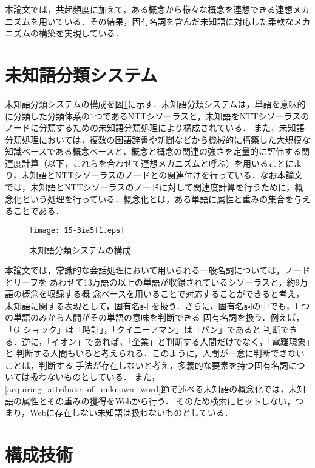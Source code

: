 \documentclass[japanese]{jnlp_1.4}
\begin{document}
本論文では，共起頻度に加えて，ある概念から様々な概念を連想できる連想メカニズムを用いている．その結果，固有名詞を含んだ未知語に対応した柔軟なメカニズムの構築を実現している．



\section{未知語分類システム}\label{system}

未知語分類システムの構成を図\ref{fig:system}に示す．未知語分類システムは，単語を意味的に分類した分類体系の1つであるNTTシソーラス\cite{NTT_Thesaurus:97}と，未知語をNTTシソーラスのノードに分類するための未知語分類処理により構成されている．
また，未知語分類処理においては，複数の国語辞書や新聞などから機械的に構築した大規模な知識ベースである概念ベース\cite{okumura:07}と，概念と概念の関連の強さを定量的に評価する関連度計算\cite{watabe:06}（以下，これらを合わせて連想メカニズムと呼ぶ）を用いることにより，未知語とNTTシソーラスのノードとの関連付けを行っている．なお本論文では，未知語とNTTシソーラスのノードに対して関連度計算を行うために，概念化という処理を行っている．概念化とは，ある単語に属性と重みの集合を与えることである．

\begin{figure}[b]
\begin{center}
\texttt{[image: 15-3ia5f1.eps]}
\end{center}
\caption{未知語分類システムの構成}
\label{fig:system}
\end{figure}

本論文では，常識的な会話処理において用いられる一般名詞については，ノードとリーフを
あわせて13万語の以上の単語が収録されているシソーラスと，約9万語の概念を収録する概
念ベースを用いることで対応することができると考え，未知語に関する表現として，固有名詞
を扱う．さらに，固有名詞の中でも，1 つの単語のみから人間がその単語の意味を判断できる
固有名詞を扱う．例えば，「G ショック」は「時計」，「クイニーアマン」は「パン」であると
判断できる．逆に，「イオン」であれば，「企業」と判断する人間だけでなく，「電離現象」と
判断する人間もいると考えられる．このように，人間が一意に判断できないことは，判断する
手法が存在しないと考え，多義的な要素を持つ固有名詞については扱わないものとしている．
また，\ref{acquiring_attribute_of_unknown_word}節で述べる未知語の概念化では，未知語の属性とその重みの獲得をWebから行う．
そのため検索にヒットしない，つまり，Webに存在しない未知語は扱わないものとしている．


\section{構成技術}\label{constructing_technique}
\end{document}
